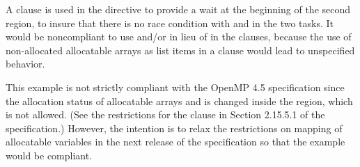 A  clause is used in the  directive to provide a wait at the beginning of the second 
 region, to insure that there is no race condition with  and  in the two tasks.
It would be noncompliant to use  and/or  in lieu of  in the  clauses, 
because the use of non-allocated allocatable arrays as list items in a  clause would 
lead to unspecified behavior. 

\noteheader{--} This example is not strictly compliant with the OpenMP 4.5 specification since the allocation status
of allocatable arrays  and  is changed inside the  region, which is not allowed.
(See the restrictions for the  clause in Section 2.15.5.1 of the specification.)
However, the intention is to relax the restrictions on mapping of allocatable variables in the next release
of the specification so that the example would be compliant.

